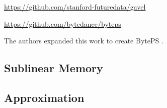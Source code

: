 \url{https://github.com/stanford-futuredata/gavel}


\url{https://github.com/bytedance/byteps}


The authors expanded this work to create BytePS \cite{osdi/2020/jiang}.

\subsection{Sublinear Memory}




\subsection{Approximation}


